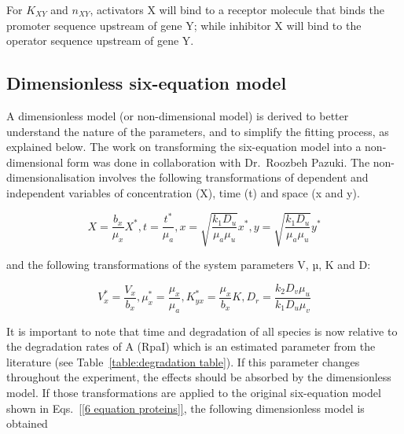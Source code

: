 For $K_{XY}$ and $n_{XY}$,
activators X will bind to a receptor molecule that binds the promoter sequence upstream of gene Y;
while inhibitor X will bind to the operator sequence upstream of gene Y.



\subsection{Dimensionless six-equation model}

A dimensionless model (or non-dimensional model) is derived to better understand the nature of the parameters,
and to simplify the fitting process, as explained below.
The work on transforming the six-equation model into a non-dimensional form was done in collaboration with Dr.~Roozbeh Pazuki.
The non-dimensionalisation involves the following transformations of dependent and independent variables of concentration
(X),
time (t) and space
(x and y).


\begin{equation}\label{variable transformations}
    X = \frac{b_{x}}{\mu_{x}}X^*, t = \frac{t^*}{\mu_{a}},
    x = \sqrt{\frac{k_{1}D_{u}}{\mu_{a}\mu_{u}}}x^*, y = \sqrt{\frac{k_{1}D_{u}}{\mu_{a}\mu_{u}}}y^*
\end{equation}

and the following transformations of the system parameters V, µ, K and D:

\begin{equation}\label{parameter transformations}
    V_{x}^*=\frac{V_{x}}{b_{x}},  \mu_{x}^* = \frac{\mu_{x}}{\mu_{a}},
K^*_{yx} = \frac{\mu_{x}}{b_{x}}K ,D_{r} = \frac{k_{2}D_{v}\mu_{u}}{k_{1}D_{u}\mu_{v}}
\end{equation}

It is important to note that time and degradation of all species is now relative to the degradation rates of A
(RpaI) which is an estimated parameter from the literature
(see Table~\ref{table:degradation table}).
If this parameter changes throughout the experiment, the effects should be absorbed by the dimensionless model.
If those transformations are applied to the original six-equation model shown in Eqs.~\ref{[6 equation proteins]}, the following dimensionless model is obtained

